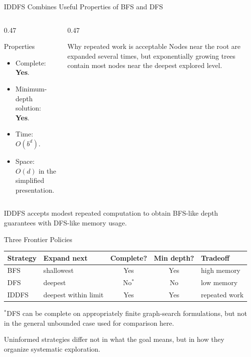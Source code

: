 \documentclass[aspectratio=169,10pt]{beamer}
\begin{document}
\begin{frame}[shrink=20]{IDDFS Combines Useful Properties of BFS and DFS}
  \begin{columns}[T,onlytextwidth]
    \begin{column}{0.47\textwidth}
      \begin{block}{Properties}
        \begin{itemize}
          \item Complete: \textbf{Yes}.
          \item Minimum-depth solution: \textbf{Yes}.
          \item Time: $O(b^d)$.
          \item Space: $O(d)$ in the simplified presentation.
        \end{itemize}
      \end{block}
    \end{column}

    \begin{column}{0.47\textwidth}
      \begin{block}{Why repeated work is acceptable}
        Nodes near the root are expanded several times, but exponentially growing trees contain most nodes near the deepest explored level.
      \end{block}
    \end{column}
  \end{columns}

  \begin{keyidea}
    IDDFS accepts modest repeated computation to obtain BFS-like depth guarantees with DFS-like memory usage.
  \end{keyidea}
\end{frame}

\begin{frame}[shrink=20]{Three Frontier Policies}
  \begin{center}
    \renewcommand{\arraystretch}{1.35}
    \begin{tabular}{l|l|c|c|l}
      \textbf{Strategy} & \textbf{Expand next} & \textbf{Complete?} & \textbf{Min depth?} & \textbf{Tradeoff} \\\hline
      BFS & shallowest & Yes & Yes & high memory \\
      DFS & deepest & No$^*$ & No & low memory \\
      IDDFS & deepest within limit & Yes & Yes & repeated work
    \end{tabular}
  \end{center}

  \vspace{0.08in}
  \scriptsize $^*$DFS can be complete on appropriately finite graph-search formulations, but not in the general unbounded case used for comparison here.

  \begin{keyidea}
    Uninformed strategies differ not in what the goal means, but in how they organize systematic exploration.
  \end{keyidea}
\end{frame}
\end{document}
